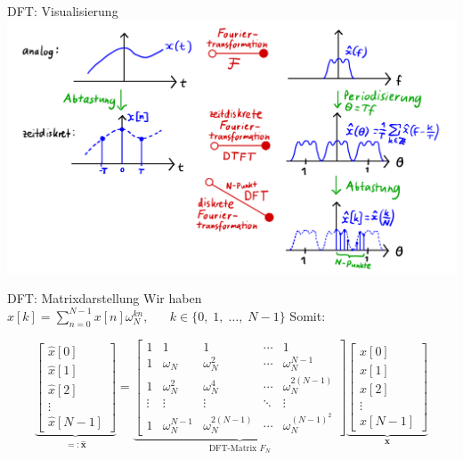 \documentclass[14pt, aspectratio=169, handout]{beamer}
\begin{document}
\begin{frame}{DFT: Visualisierung}
    \includegraphics[width=0.95\linewidth]{figures/DFT_visuals.jpeg}
\end{frame}

\begin{frame}{DFT: Matrixdarstellung}
    Wir haben $\hat{x}[k] = \displaystyle\sum_{n=0}^{N-1} x[n]\omega_N^{kn}, \hspace{20pt} k \in \{ 0, \; 1, \; \dots, \; N-1 \}$ Somit:

$$\underbrace{\begin{bmatrix}
    \hat{x}[0] \\
    \hat{x}[1] \\
    \hat{x}[2] \\
    \vdots \\
    \hat{x}[N-1]
\end{bmatrix}}_{=: \hat{\mathbf{x}}} = \underbrace{\begin{bmatrix}
    1 & 1 & 1 & \cdots & 1 \\
    1 & \omega_N & \omega_N^2 & \cdots & \omega_N^{N-1} \\
    1 & \omega_N^2 & \omega_N^4 & \cdots & \omega_N^{2(N-1)} \\
    \vdots & \vdots & \vdots & \ddots & \vdots \\
    1 & \omega_N^{N-1} & \omega_N^{2(N-1)} & \cdots & \omega_N^{(N-1)^2}
\end{bmatrix}}_{\text{DFT-Matrix } F_N} \underbrace{\begin{bmatrix}
    x[0] \\
    x[1] \\
    x[2] \\
    \vdots \\
    x[N-1]
\end{bmatrix}}_{\mathbf{x}}$$

\end{frame}
\end{document}
